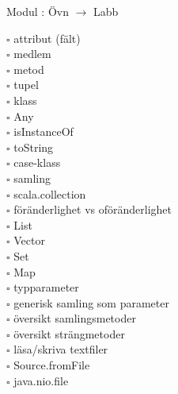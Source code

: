 
    Modul : Övn  $\rightarrow$ Labb 
    \begin{multicols}{3}\SlideFontTiny
    $\square$ attribut (fält) \\
$\square$ medlem \\
$\square$ metod \\
$\square$ tupel \\
$\square$ klass \\
$\square$ Any \\
$\square$ isInstanceOf \\
$\square$ toString \\
$\square$ case-klass \\
$\square$ samling \\
$\square$ scala.collection \\
$\square$ föränderlighet vs oföränderlighet \\
$\square$ List \\
$\square$ Vector \\
$\square$ Set \\
$\square$ Map \\
$\square$ typparameter \\
$\square$ generisk samling som parameter \\
$\square$ översikt samlingsmetoder \\
$\square$ översikt strängmetoder \\
$\square$ läsa/skriva textfiler \\
$\square$ Source.fromFile \\
$\square$ java.nio.file \\
    \end{multicols}
    